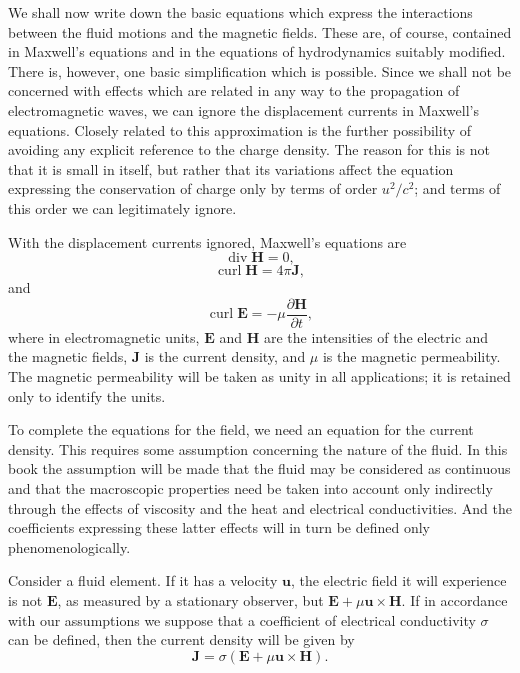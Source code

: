 We shall now write down the basic equations which express the interactions between the fluid motions and the magnetic fields. These are, of course, contained in Maxwell's equations and in the equations of hydrodynamics suitably modified. There is, however, one basic simplification which is possible. Since we shall not be concerned with effects which are related in any way to the propagation of electromagnetic waves, we can ignore the displacement currents in Maxwell's equations. Closely related to this approximation is the further possibility of avoiding any explicit reference to the charge density. The reason for this is not that it is small in itself, but rather that its variations affect the equation expressing the conservation of charge only by terms of order $u^2/c^2$; and terms of this order we can legitimately ignore.

With the displacement currents ignored, Maxwell's equations are
\begin{equation}
\label{eq:4-1}
\operatorname{div} \mathbf{H} = 0,
\end{equation}
\begin{equation}
\label{eq:4-2}
\operatorname{curl} \mathbf{H} = 4\pi \mathbf{J},
\end{equation}
and
\begin{equation}
\label{eq:4-3}
\operatorname{curl} \mathbf{E} = -\mu \frac{\partial \mathbf{H}}{\partial t},
\end{equation}
where in electromagnetic units, $\mathbf{E}$ and $\mathbf{H}$ are the intensities of the electric and the magnetic fields, $\mathbf{J}$ is the current density, and $\mu$ is the magnetic permeability. The magnetic permeability will be taken as unity in all applications; it is retained only to identify the units.

To complete the equations for the field, we need an equation for the current density. This requires some assumption concerning the nature of the fluid. In this book the assumption will be made that the fluid may be considered as continuous and that the macroscopic properties need be taken into account only indirectly through the effects of viscosity and the heat and electrical conductivities. And the coefficients expressing these latter effects will in turn be defined only phenomenologically.

Consider a fluid element. If it has a velocity $\mathbf{u}$, the electric field it will experience is not $\mathbf{E}$, as measured by a stationary observer, but $\mathbf{E}+\mu\mathbf{u}\times\mathbf{H}$. If in accordance with our assumptions we suppose that a coefficient of electrical conductivity $\sigma$ can be defined, then the current density will be given by
\begin{equation}
\label{eq:4-4}
\mathbf{J} = \sigma(\mathbf{E}+\mu\mathbf{u}\times\mathbf{H}).
\end{equation}


